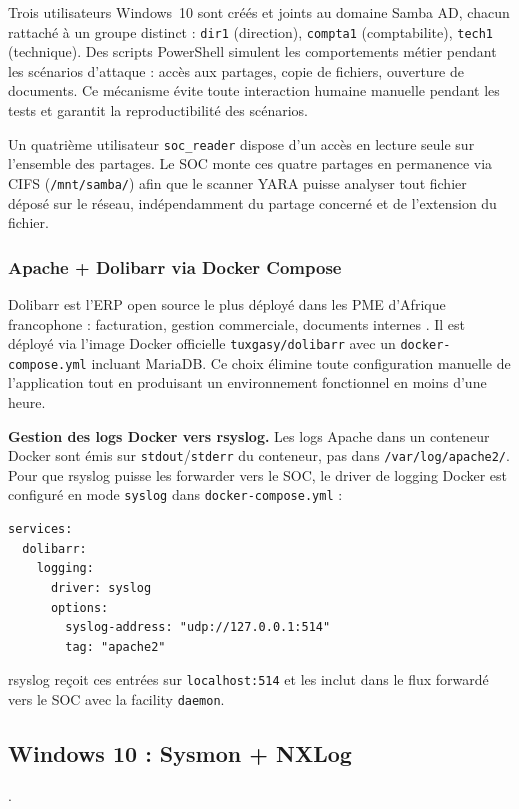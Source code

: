 \documentclass[12pt,a4paper]{article}
\begin{document}
Trois utilisateurs Windows~10 sont créés et joints au domaine Samba AD,
chacun rattaché à un groupe distinct : \texttt{dir1} (direction),
\texttt{compta1} (comptabilite), \texttt{tech1} (technique). Des scripts
PowerShell simulent les comportements métier pendant les scénarios
d'attaque : accès aux partages, copie de fichiers, ouverture de documents.
Ce mécanisme évite toute interaction humaine manuelle pendant les tests
et garantit la reproductibilité des scénarios.

Un quatrième utilisateur \texttt{soc\_reader} dispose d'un accès en
lecture seule sur l'ensemble des partages. Le SOC monte ces quatre
partages en permanence via CIFS (\texttt{/mnt/samba/}) afin que le
scanner YARA puisse analyser tout fichier déposé sur le réseau,
indépendamment du partage concerné et de l'extension du fichier.

\subsubsection{Apache + Dolibarr via Docker Compose}

Dolibarr est l'ERP open source le plus déployé dans les PME d'Afrique
francophone : facturation, gestion commerciale, documents internes
\cite{dolibarr}. Il est déployé via l'image Docker officielle
\texttt{tuxgasy/dolibarr} avec un \texttt{docker-compose.yml} incluant
MariaDB. Ce choix élimine toute configuration manuelle de l'application
tout en produisant un environnement fonctionnel en moins d'une heure.

\textbf{Gestion des logs Docker vers rsyslog.} Les logs Apache dans un
conteneur Docker sont émis sur \texttt{stdout}/\texttt{stderr} du conteneur,
pas dans \texttt{/var/log/apache2/}. Pour que rsyslog puisse les forwarder
vers le SOC, le driver de logging Docker est configuré en mode
\texttt{syslog} dans \texttt{docker-compose.yml} :

\begin{lstlisting}
services:
  dolibarr:
    logging:
      driver: syslog
      options:
        syslog-address: "udp://127.0.0.1:514"
        tag: "apache2"
\end{lstlisting}

rsyslog reçoit ces entrées sur \texttt{localhost:514} et les inclut dans
le flux forwardé vers le SOC avec la facility \texttt{daemon}.

\subsection{Windows 10 : Sysmon + NXLog}.
\end{document}
